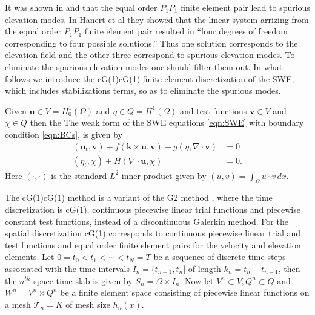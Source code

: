 It was shown in \cite{Hanert2002} and \cite{Le-Roux1998} that the equal order
$P_1P_1$ finite element pair lead to spurious elevation modes. In Hanert et al
\cite{Hanert2002} they showed that the linear system arrizing from the equal
order $P_1P_1$ finite element pair resulted in ``four degrees of freedom
corresponding to four possible solutions.'' Thus one solution corresponds to the
elevation field and the other three correspond to spurious elevation modes. To
eliminate the spurious elevation modes one should filter them out. In what
follows we introduce the cG(1)cG(1) finite element discretization of the SWE,
which includes stabilizations terms, so as to eliminate the spurious modes.

Given $\mathbf{u} \in V=H^1_0(\Omega)$ and $\eta \in Q=H^1(\Omega)$ and
test functions $\mathbf{v} \in V$ and $\chi \in Q$ then the The weak form of the
SWE equations \eqref{eqn:SWE} with boundary condition \eqref{eqn:BCs}, is given
by
\begin{equation}
  \begin{split}
    (\mathbf{u}_t, \mathbf{v}) + f(\mathbf{k} \times
        \mathbf{u}, \mathbf{v}) - g (\eta, \nabla\cdot \mathbf{v}) &= 0\\
    (\eta_t, \chi) + H (\nabla\cdot \mathbf{u},\chi) &= 0.
  \end{split}
  \label{eqn:WeakSWE}
\end{equation}
Here $(\cdot, \cdot)$ is the standard $L^2$-inner product given by $(u,v) =
\int_{\Omega}\! u\cdot v\, dx$.

The cG(1)cG(1) method is a variant of the G2 method \cite{Johnson1998}, where
the time discretization is cG(1), continuous piecewise linear trial functions
and piecewise constant test functions, instead of a discontinuous Galerkin
method. For the spatial discretization cG(1) corresponds to continuous piecewise
linear trial and test functions and equal order finite element pairs for the
velocity and elevation elements. Let $0 = t_0 < t_1 < \cdots < t_N = T$ be a
sequence of discrete time steps associated with the time intervals $I_n =
(t_{n-1},t_n]$ of length $k_n = t_n - t_{n-1}$, then the $n^{th}$
space-time slab is given by $S_n = \Omega \times I_n$. Now let $V^n \subset V,
Q^n \subset Q$ and $W^n = V^n \times Q^n$ be a finite element space consisting
of piecewise linear functions on a mesh $\mathcal{T}_n = {K}$ of mesh size
$h_n(x)$.

